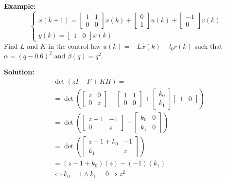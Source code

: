 \begin{multicols}{2}
\textbf{Example:}
\begin{equation*}
\left\{\begin{array}{l}
    x(k+1) = \begin{bmatrix} 1 & 1 \\ 0 & 0 \end{bmatrix}x(k) + \begin{bmatrix} 0 \\ 1 \end{bmatrix}u(k) + \begin{bmatrix} -1 \\ 0 \end{bmatrix}v(k) \\
    y(k) = \begin{bmatrix} 1 & 0 \end{bmatrix}x(k)
    \end{array}\right.
\end{equation*}
Find $L$ and $K$ in the control law $u(k) = -L\hat{x}(k) + l_0 r(k)$ such that $\alpha = (q - 0.6)^2$ and $\beta(q) = q^2$.

\textbf{Solution:} 
\begin{align*}
    &\det(zI-F+KH) = \\
    &= \det\left( \begin{bmatrix} z & 0 \\ 0 & z \end{bmatrix} - \begin{bmatrix} 1 & 1 \\ 0 & 0 \end{bmatrix} + \begin{bmatrix} k_0 \\ k_1 \end{bmatrix}\begin{bmatrix} 1 & 0 \end{bmatrix} \right) \\
    &= \det\left( \begin{bmatrix} z-1 & -1 \\ 0 & z \end{bmatrix} + \begin{bmatrix} k_0 & 0 \\ k_1 & 0 \end{bmatrix} \right) \\
    &= \det\left( \begin{bmatrix} z-1+k_0 & -1 \\ k_1 & z \end{bmatrix} \right) \\
    &= (z-1+k_0)(z) - (-1)(k_1)  \\
    &\Leftrightarrow k_0 = 1 \land k_1 = 0 \Rightarrow z^2
\end{align*}


\end{multicols}
